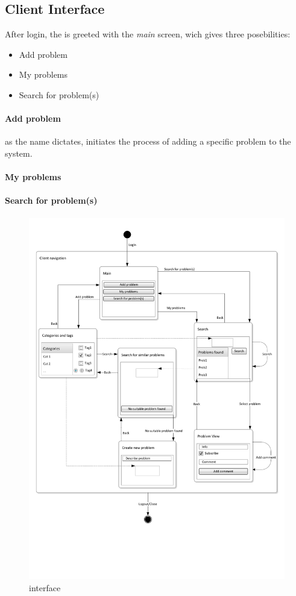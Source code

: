 \subsection{Client Interface}

After login, the \aclient[] is greeted with the \textit{main} screen, wich gives three posebilities:
\begin{itemize}
	\item Add problem
	\item My problems
	\item Search for problem(s)
\end{itemize}

\paragraph{Add problem} as the name dictates, initiates the process of adding a specific problem to the system.
\paragraph{My problems}
\paragraph{Search for problem(s)}



\begin{figure}[h]
\begin{center}
 \includegraphics[scale=0.70]{input/application_domain_analysis/client_interface}
\caption{\Client[] interface}
\label{fig:client_interface}
\end{center}
\end{figure}

